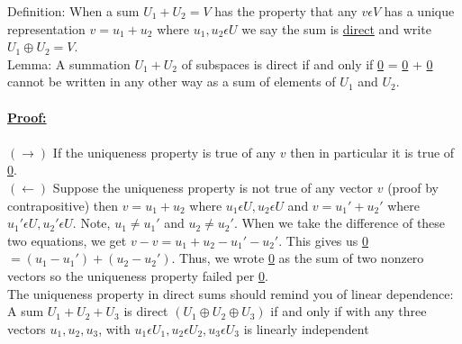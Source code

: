 \documentclass{article}
\begin{document}
Definition: When a sum $U_1 + U_2 = V$ has the property that any $v \epsilon V$ has a unique representation $v = u_1 + u_2$ where $u_1, u_2 \epsilon U$ we say the sum is \underline{direct} and write $U_1 \oplus U_2 = V$. \\

Lemma: A summation $U_1 + U_2$ of subspaces is direct if and only if \underline{0} = \underline{0} + \underline{0} cannot be written in any other way as a sum of elements of $U_1$ and $U_2$.\\\\
\textbf{\underline{Proof:}}\\ \\ $(\rightarrow)$ If the uniqueness property is true of any $v$ then in particular it is true of \underline{0}. \\
$(\leftarrow)$ Suppose the uniqueness property is not true of any vector $v$ (proof by contrapositive) then $v = u_1 + u_2$ where $u_1 \epsilon U, u_2 \epsilon U$ and $v = u_1' + u_2'$ where $u_1' \epsilon U, u_2' \epsilon U$. Note, $u_1 \neq u_1'$ and $u_2 \neq u_2'$. When we take the difference of these two equations, we get 
$v - v = u_1 + u_2 - u_1' - u_2'$. This gives us \underline{0} $= (u_1 - u_1') + (u_2 - u_2')$. Thus, we wrote \underline{0} as the sum of two nonzero vectors so the uniqueness property failed per \underline{0}.\\

The uniqueness property in direct sums should remind you of linear dependence: A sum $U_1 + U_2 + U_3$ is direct $(U_1 \oplus U_2 \oplus U_3)$ if and only if with any three vectors $u_1, u_2, u_3$, with $u_1 \epsilon U_1, u_2 \epsilon U_2, u_3 \epsilon U_3$ is linearly independent
\end{document}
